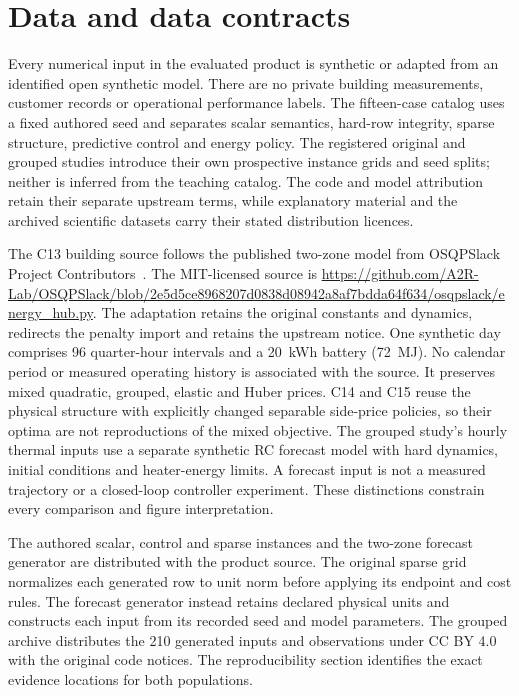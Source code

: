 \section{Data and data contracts}\label{sec:data}
Every numerical input in the evaluated product is synthetic or adapted from an
identified open synthetic model. There are no private building measurements,
customer records or operational performance labels. The fifteen-case catalog
uses a fixed authored seed and separates scalar semantics, hard-row integrity,
sparse structure, predictive control and energy policy. The registered original
and grouped studies introduce their own prospective instance grids and seed
splits; neither is inferred from the teaching catalog. The code and model
attribution retain their separate upstream terms, while explanatory material
and the archived scientific datasets carry their stated distribution licences.

The C13 building source follows the published two-zone model from OSQPSlack
Project Contributors~\cite{gsp}. The MIT-licensed source is
\url{https://github.com/A2R-Lab/OSQPSlack/blob/2e5d5ce8968207d0838d08942a8af7bdda64f634/osqpslack/energy_hub.py}.
The adaptation retains the original constants and dynamics, redirects the
penalty import and retains the upstream notice. One synthetic day comprises
96 quarter-hour intervals and a 20~kWh battery (72~MJ). No calendar period
or measured operating history is associated with the source. It preserves
mixed quadratic, grouped, elastic and Huber prices. C14 and C15 reuse the physical structure with
explicitly changed separable side-price policies, so their optima are not
reproductions of the mixed objective. The grouped study's hourly thermal inputs
use a separate synthetic RC forecast model with hard dynamics, initial conditions
and heater-energy limits. A forecast input is not a measured trajectory or a
closed-loop controller experiment. These distinctions constrain every comparison
and figure interpretation.

The authored scalar, control and sparse instances and the two-zone forecast
generator are distributed with the product source. The original sparse grid
normalizes each generated row to unit norm before applying its endpoint
and cost rules. The forecast generator instead retains declared physical
units and constructs each input from its recorded seed and model parameters.
The grouped archive distributes the 210 generated inputs and observations
under CC BY 4.0 with the original code notices. The reproducibility section
identifies the exact evidence locations for both populations.

